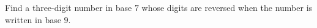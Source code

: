 Find a three-digit number in base $7$ whose digits are reversed when the number is written in base $9$.
